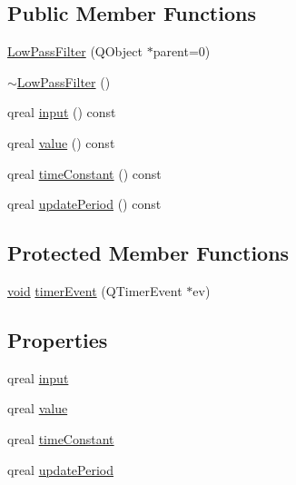 \subsection*{\-Public \-Member \-Functions}
\begin{DoxyCompactItemize}
\item 
\hyperlink{class_low_pass_filter_a34f68a23df793e64436da736a7580423}{\-Low\-Pass\-Filter} (\-Q\-Object $\ast$parent=0)
\item 
\hyperlink{class_low_pass_filter_a0c3f3acc5df212a1e702252af9cb27ef}{$\sim$\-Low\-Pass\-Filter} ()
\item 
qreal \hyperlink{class_low_pass_filter_a2b06f75027c1663872aae67bdbdf0579}{input} () const 
\item 
qreal \hyperlink{class_low_pass_filter_ab6afdd634d2f59a7e7b3391a62f226eb}{value} () const 
\item 
qreal \hyperlink{class_low_pass_filter_a93af69b2fc850730ad5053b2dc5832d0}{time\-Constant} () const 
\item 
qreal \hyperlink{class_low_pass_filter_a5e78b303f3293ed766297d6441dcfdbb}{update\-Period} () const 
\end{DoxyCompactItemize}
\subsection*{\-Protected \-Member \-Functions}
\begin{DoxyCompactItemize}
\item 
\hyperlink{group___u_a_v_objects_plugin_ga444cf2ff3f0ecbe028adce838d373f5c}{void} \hyperlink{class_low_pass_filter_a56d8065f6aba6ab1e3dff9a337d6d797}{timer\-Event} (\-Q\-Timer\-Event $\ast$ev)
\end{DoxyCompactItemize}
\subsection*{\-Properties}
\begin{DoxyCompactItemize}
\item 
qreal \hyperlink{class_low_pass_filter_a9a9e7b2ff54b0fc7268a5cc3e9e6fbf4}{input}
\item 
qreal \hyperlink{class_low_pass_filter_abf649373a1b2f12fc6b6ffa4842dc2f7}{value}
\item 
qreal \hyperlink{class_low_pass_filter_ab761ee5ebd0249c6724c17d1e0d42500}{time\-Constant}
\item 
qreal \hyperlink{class_low_pass_filter_a2587a6787fa752084a473ec21a25222a}{update\-Period}
\end{DoxyCompactItemize}


